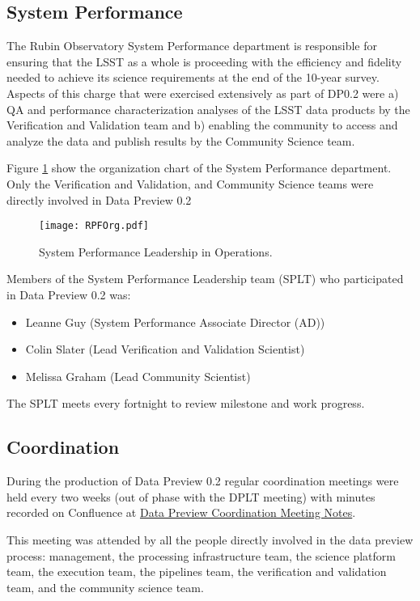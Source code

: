\subsection{System Performance}
The Rubin Observatory System Performance department is responsible for ensuring that the LSST as a whole is proceeding with the efficiency and fidelity needed to achieve its science requirements at the end of the 10-year survey. 
Aspects of this charge that were exercised extensively as part of DP0.2 were a) QA and performance characterization analyses of the LSST data products by the Verification and Validation team and b) enabling the community to access and analyze the data and publish results by the Community Science team.

Figure \ref{fig:RPFOrg} show the organization chart of the System Performance department. 
Only the Verification and Validation, and Community Science teams were directly involved in Data Preview 0.2
\begin{figure}
\texttt{[image: RPFOrg.pdf]}
\caption{System Performance Leadership in Operations.  \label{fig:RPFOrg}}
\end{figure}

Members of the System Performance Leadership team (SPLT) who participated in Data Preview 0.2 was:
\begin{itemize}
\item Leanne Guy (System Performance Associate Director (AD))
\item Colin Slater (Lead Verification and Validation Scientist)
\item Melissa Graham (Lead Community Scientist)
\end{itemize}
The SPLT meets every fortnight to review milestone and work progress. 

\subsection{Coordination}

During the production of Data Preview 0.2 regular coordination meetings were held every two weeks (out of phase with the DPLT meeting) with minutes recorded on Confluence at \href{https://confluence.lsstcorp.org/display/LSSTOps/Data+Preview+Coordination+Meeting+Notes}{Data Preview Coordination Meeting Notes}.

This meeting was attended by all the people directly involved in the data preview process: management, the processing infrastructure team, the science platform team, the execution team, the pipelines team, the verification and validation team, and the community science team.

